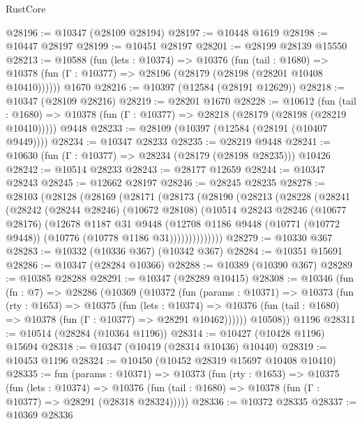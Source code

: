 \begin{lexlean}{RustCore}
\begin{coremodule}
@28196 := @10347 (@28109 @28194)
@28197 := @10448 @1619
@28198 := @10447 @28197
@28199 := @10451 @28197
@28201 := @28199 @28139 @15550
@28213 := @10588
    (fun (lets : @10374) =>
    @10376
      (fun (tail : @1680) =>
      @10378 (fun (Γ : @10377) => @28196 (@28179 (@28198 (@28201 @10408 @10410))))))
    @1670
@28216 := @10397 (@12584 (@28191 @12629))
@28218 := @10347 (@28109 @28216)
@28219 := @28201 @1670
@28228 := @10612
    (fun (tail : @1680) => @10378 (fun (Γ : @10377) => @28218 (@28179 (@28198 (@28219 @10410)))))
    @9448
@28233 := @28109 (@10397 (@12584 (@28191 (@10407 @9449))))
@28234 := @10347 @28233
@28235 := @28219 @9448
@28241 := @10630 (fun (Γ : @10377) => @28234 (@28179 (@28198 @28235))) @10426
@28242 := @10514 @28233
@28243 := @28177 @12659
@28244 := @10347 @28243
@28245 := @12662 @28197
@28246 := @28245 @28235
@28278 := @28103
    (@28128
      (@28169
        (@28171
          (@28173
            (@28190
              (@28213
                (@28228
                  (@28241
                    (@28242
                      (@28244 @28246)
                      (@10672 @28108)
                      (@10514
                        @28243
                        @28246
                        (@10677 @28176)
                        (@12678
                          @1187
                          @31
                          @9448
                          (@12708
                            @1186
                            @9448
                            (@10771 (@10772 @9448))
                            (@10776 (@10778 @1186 @31))))))))))))))
@28279 := @10330 @367
@28283 := @10332 (@10336 @367) (@10342 @367)
@28284 := @10351 @15691
@28286 := @10347 (@28284 @10366)
@28288 := @10389 (@10390 @367)
@28289 := @10385 @28288
@28291 := @10347 (@28289 @10415)
@28308 := @10346
    (fun (fn : @7) =>
    @28286
      (@10369
        (@10372
          (fun (params : @10371) =>
          @10373
            (fun (rty : @1653) =>
            @10375
              (fun (lets : @10374) =>
              @10376 (fun (tail : @1680) => @10378 (fun (Γ : @10377) => @28291 @10462))))))
        @10508))
    @1196
@28311 := @10514 (@28284 (@10364 @1196))
@28314 := @10427 (@10428 @1196) @15694
@28318 := @10347 (@10419 (@28314 @10436) @10440)
@28319 := @10453 @1196
@28324 := @10450 (@10452 @28319 @15697 @10408 @10410)
@28335 := fun (params : @10371) =>
  @10373
    (fun (rty : @1653) =>
    @10375
      (fun (lets : @10374) =>
      @10376 (fun (tail : @1680) => @10378 (fun (Γ : @10377) => @28291 (@28318 @28324)))))
@28336 := @10372 @28335
@28337 := @10369 @28336

\end{coremodule}
\end{lexlean}

